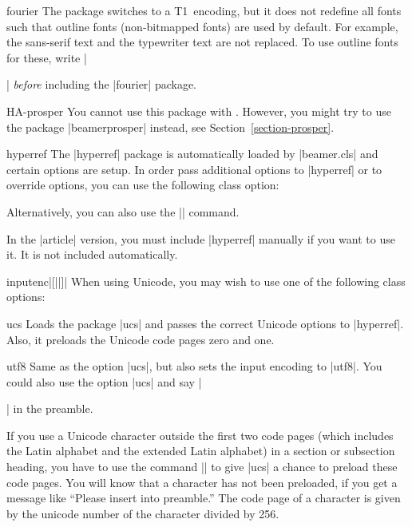 \begin{package}{{fourier}}
  The package switches to a T1~encoding, but it does not redefine all
  fonts such that outline fonts (non-bitmapped fonts) are used by
  default. For example, the sans-serif text and the typewriter text
  are not replaced. To use outline fonts for these, write
  |\usepackage{lmodern}| \emph{before} including the |fourier|
  package. 
\end{package}

\begin{package}{{HA-prosper}}
  You cannot use this package with \beamer. However, you might try to
  use the package |beamerprosper| instead, see
  Section~\ref{section-prosper}. 
\end{package}

\begin{package}{{hyperref}}
  \beamernote
  The |hyperref| package is automatically loaded by |beamer.cls| and
  certain options are setup. In order pass additional options to
  |hyperref| or to override options, you can use the following class
  option: 


  Alternatively, you can also use the |\hypersetup| command.

  \articlenote
  In the |article| version, you must include |hyperref| manually if
  you want to use it. It is not included automatically.
\end{package}

\begin{package}{{inputenc}|[||]|}
  \beamernote
  When using Unicode, you may wish to use one of the following class
  options: 
  \begin{classoption}{ucs}
    Loads the package |ucs| and passes the correct Unicode options to
    |hyperref|. Also, it preloads the Unicode code pages zero and
    one.
  \end{classoption}
  
  \begin{classoption}{utf8}
    Same as the option |ucs|, but also sets the input encoding to
    |utf8|. You could also use the option |ucs| and say
    |\usepackage[utf8]{inputenc}| in the preamble.
  \end{classoption}

  If you use a Unicode character outside the first two code pages
  (which includes the Latin alphabet and the extended Latin alphabet)
  in a section or subsection heading, you have to use the command
  || to give |ucs| a chance to
  preload these code pages. You will know that a character has not
  been preloaded, if you get a message like ``Please insert into
  preamble.'' The code page of a character is given by the unicode
  number of the character divided by 256.
\end{package}

